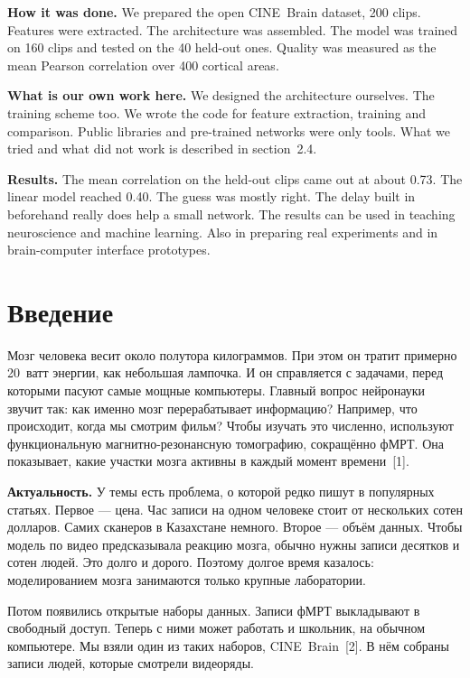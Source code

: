 \documentclass[12pt,a4paper]{article}
\begin{document}
\textbf{How it was done.} We prepared the open CINE~Brain dataset,
200 clips. Features were extracted. The architecture was assembled. The
model was trained on 160 clips and tested on the 40 held-out ones.
Quality was measured as the mean Pearson correlation over 400 cortical
areas.

\textbf{What is our own work here.} We designed the architecture
ourselves. The training scheme too. We wrote the code for feature
extraction, training and comparison. Public libraries and pre-trained
networks were only tools. What we tried and what did not work is
described in section~2.4.

\textbf{Results.} The mean correlation on the held-out clips came out
at about 0.73. The linear model reached 0.40. The guess was mostly
right. The delay built in beforehand really does help a small network.
The results can be used in teaching neuroscience and machine learning.
Also in preparing real experiments and in brain-computer interface
prototypes.

\newpage

\section{Введение}

Мозг человека весит около полутора килограммов. При этом он тратит
примерно 20~ватт энергии, как небольшая лампочка. И он справляется с
задачами, перед которыми пасуют самые мощные компьютеры. Главный вопрос
нейронауки звучит так: как именно мозг перерабатывает информацию?
Например, что происходит, когда мы смотрим фильм? Чтобы изучать это
численно, используют функциональную магнитно-резонансную томографию,
сокращённо фМРТ. Она показывает, какие участки мозга активны в каждый
момент времени~[1].

\textbf{Актуальность.} У темы есть проблема, о которой редко пишут в
популярных статьях. Первое — цена. Час записи на одном человеке стоит
от нескольких сотен долларов. Самих сканеров в Казахстане немного.
Второе — объём данных. Чтобы модель по видео предсказывала реакцию
мозга, обычно нужны записи десятков и сотен людей. Это долго и дорого.
Поэтому долгое время казалось: моделированием мозга занимаются только
крупные лаборатории.

Потом появились открытые наборы данных. Записи фМРТ выкладывают в
свободный доступ. Теперь с ними может работать и школьник, на обычном
компьютере. Мы взяли один из таких наборов, CINE~Brain~[2]. В нём
собраны записи людей, которые смотрели видеоряды.
\end{document}
